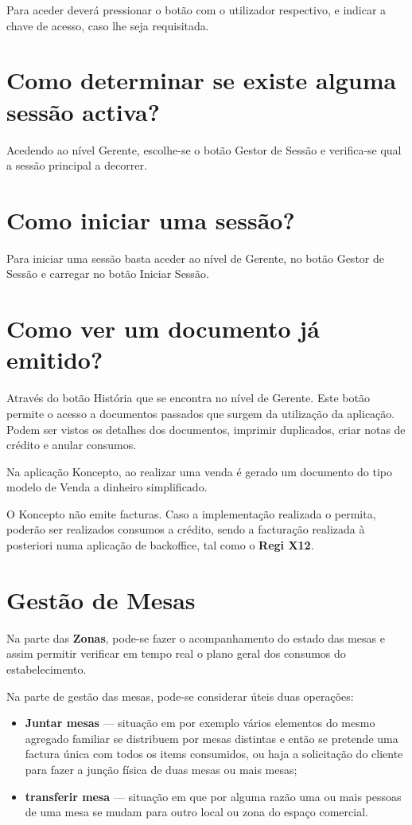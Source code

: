 \documentclass[a4paper,11pt,openany]{memoir}
\begin{document}
Para aceder deverá pressionar o botão com o utilizador respectivo, e indicar a chave
de acesso, caso lhe seja requisitada.

\section{Como determinar se existe alguma sessão activa?}
Acedendo ao nível Gerente, escolhe-se o botão Gestor de Sessão e verifica-se qual
a sessão principal a decorrer.

\section{Como iniciar uma sessão?}
Para iniciar uma sessão basta aceder ao nível de Gerente, no botão Gestor de
Sessão e carregar no botão Iniciar Sessão.


\section{Como ver um documento já emitido?}
Através do botão História que se encontra no nível de Gerente.
Este botão permite o
acesso a documentos passados que surgem da utilização da aplicação. Podem ser
vistos os detalhes dos documentos, imprimir duplicados,
criar notas de crédito e anular consumos.

Na aplicação Koncepto, ao realizar uma venda é gerado um documento do tipo
modelo de Venda a dinheiro simplificado.

O Koncepto não emite facturas. Caso a implementação realizada
o permita, poderão ser realizados consumos a crédito, sendo a facturação realizada
à posteriori numa aplicação de backoffice, tal como o \textbf{Regi X12}.

\section{Gestão de Mesas}

Na parte das \textbf{Zonas}, pode-se fazer o acompanhamento do estado das mesas e assim
permitir verificar em tempo real o plano geral dos consumos do estabelecimento.

Na parte de gestão das mesas, pode-se considerar úteis duas operações:
\begin{itemize}
\item \textbf{Juntar mesas} --- situação em por exemplo vários elementos do mesmo agregado familiar
se distribuem por mesas distintas e então se pretende uma factura única com todos os items
consumidos, ou haja a solicitação do cliente para fazer a junção física de duas mesas ou mais mesas;
\item \textbf{transferir mesa} --- situação em que por alguma razão uma ou mais pessoas de uma mesa
se mudam para outro local ou zona do espaço comercial. 
\end{itemize}
\end{document}
